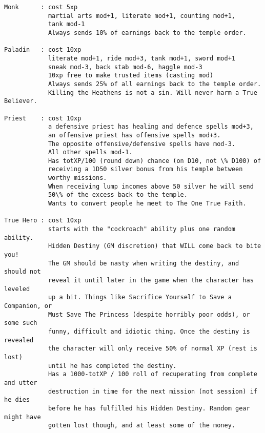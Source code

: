 \begin{verbatim}
Monk      : cost 5xp
            martial arts mod+1, literate mod+1, counting mod+1,
            tank mod-1
            Always sends 10% of earnings back to the temple order.

Paladin   : cost 10xp
            literate mod+1, ride mod+3, tank mod+1, sword mod+1
            sneak mod-3, back stab mod-6, haggle mod-3
            10xp free to make trusted items (casting mod)
            Always sends 25% of all earnings back to the temple order.
            Killing the Heathens is not a sin. Will never harm a True Believer.

Priest    : cost 10xp
            a defensive priest has healing and defence spells mod+3,
            an offensive priest has offensive spells mod+3.
            The opposite offensive/defensive spells have mod-3.
            All other spells mod-1.
            Has totXP/100 (round down) chance (on D10, not \% D100) of
            receiving a 1D50 silver bonus from his temple between
            worthy missions.
            When receiving lump incomes above 50 silver he will send
            50\% of the excess back to the temple.
            Wants to convert people he meet to The One True Faith.

True Hero : cost 10xp
            starts with the "cockroach" ability plus one random ability.
            Hidden Destiny (GM discretion) that WILL come back to bite you!
            The GM should be nasty when writing the destiny, and should not
            reveal it until later in the game when the character has leveled
            up a bit. Things like Sacrifice Yourself to Save a Companion, or
            Must Save The Princess (despite horribly poor odds), or some such
            funny, difficult and idiotic thing. Once the destiny is revealed
            the character will only receive 50% of normal XP (rest is lost)
            until he has completed the destiny.
            Has a 1000-totXP / 100 roll of recuperating from complete and utter
            destruction in time for the next mission (not session) if he dies
            before he has fulfilled his Hidden Destiny. Random gear might have
            gotten lost though, and at least some of the money.

\end{verbatim} \normalsize




